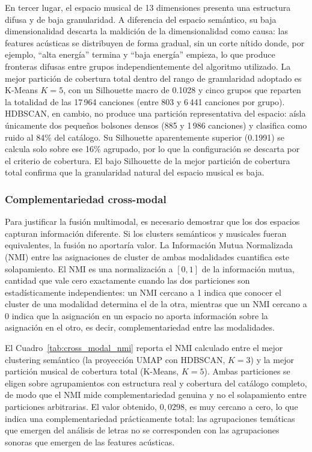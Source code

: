 En tercer lugar, el espacio musical de 13 dimensiones presenta una estructura difusa y de baja granularidad. A diferencia del espacio semántico, su baja dimensionalidad descarta la maldición de la dimensionalidad como causa: las features acústicas se distribuyen de forma gradual, sin un corte nítido donde, por ejemplo, ``alta energía'' termina y ``baja energía'' empieza, lo que produce fronteras difusas entre grupos independientemente del algoritmo utilizado. La mejor partición de cobertura total dentro del rango de granularidad adoptado es K-Means $K = 5$, con un Silhouette macro de 0.1028 y cinco grupos que reparten la totalidad de las 17\,964 canciones (entre 803 y 6\,441 canciones por grupo). HDBSCAN, en cambio, no produce una partición representativa del espacio: aísla únicamente dos pequeños bolsones densos (885 y 1\,986 canciones) y clasifica como ruido al 84\% del catálogo. Su Silhouette aparentemente superior (0.1991) se calcula solo sobre ese 16\% agrupado, por lo que la configuración se descarta por el criterio de cobertura. El bajo Silhouette de la mejor partición de cobertura total confirma que la granularidad natural del espacio musical es baja.

\subsubsection*{Complementariedad cross-modal}

Para justificar la fusión multimodal, es necesario demostrar que los dos espacios capturan información diferente. Si los clusters semánticos y musicales fueran equivalentes, la fusión no aportaría valor. La Información Mutua Normalizada (NMI) entre las asignaciones de cluster de ambas modalidades cuantifica este solapamiento. El NMI es una normalización a $[0, 1]$ de la información mutua, cantidad que vale cero exactamente cuando las dos particiones son estadísticamente independientes: un NMI cercano a 1 indica que conocer el cluster de una modalidad determina el de la otra, mientras que un NMI cercano a 0 indica que la asignación en un espacio no aporta información sobre la asignación en el otro, es decir, complementariedad entre las modalidades.



El Cuadro~\ref{tab:cross_modal_nmi} reporta el NMI calculado entre el mejor clustering semántico (la proyección UMAP con HDBSCAN, $K = 3$) y la mejor partición musical de cobertura total (K-Means, $K = 5$). Ambas particiones se eligen sobre agrupamientos con estructura real y cobertura del catálogo completo, de modo que el NMI mide complementariedad genuina y no el solapamiento entre particiones arbitrarias. El valor obtenido, $0{,}0298$, es muy cercano a cero, lo que indica una complementariedad prácticamente total: las agrupaciones temáticas que emergen del análisis de letras no se corresponden con las agrupaciones sonoras que emergen de las features acústicas.

